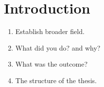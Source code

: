 \chapter{Introduction} 
\begin{enumerate}
    \item Establish broader field.
    \item What did you do? and why?
    \item What was the outcome?
    \item The structure of the thesis.
\end{enumerate}
